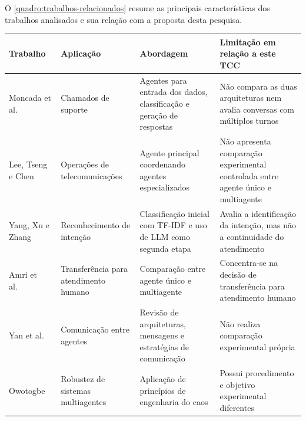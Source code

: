 O \autoref{quadro:trabalhos-relacionados} resume as principais características dos trabalhos analisados e sua relação com a proposta desta pesquisa.

\begin{quadro}[htb]
    \centering
    \caption{Síntese dos trabalhos relacionados}
    \label{quadro:trabalhos-relacionados}
    \footnotesize

    \begin{tabularx}{\textwidth}{|p{2.4cm}|p{2.8cm}|X|X|}
        \hline
        \textbf{Trabalho} &
        \textbf{Aplicação} &
        \textbf{Abordagem} &
        \textbf{Limitação em relação a este TCC} \\ \hline

        Moncada et al.~\cite{moncada2025} &
        Chamados de suporte &
        Agentes para entrada dos dados, classificação e geração de respostas &
        Não compara as duas arquiteturas nem avalia conversas com múltiplos turnos \\ \hline

        Lee, Tseng e Chen~\cite{lee2025} &
        Operações de telecomunicações &
        Agente principal coordenando agentes especializados &
        Não apresenta comparação experimental controlada entre agente único e multiagente \\ \hline

        Yang, Xu e Zhang~\cite{yang2025} &
        Reconhecimento de intenção &
        Classificação inicial com TF-IDF e uso de LLM como segunda etapa &
        Avalia a identificação da intenção, mas não a continuidade do atendimento \\ \hline

        Amri et al.~\cite{amri2026} &
        Transferência para atendimento humano &
        Comparação entre agente único e multiagente &
        Concentra-se na decisão de transferência para atendimento humano \\ \hline

        Yan et al.~\cite{yan2026} &
        Comunicação entre agentes &
        Revisão de arquiteturas, mensagens e estratégias de comunicação &
        Não realiza comparação experimental própria \\ \hline

        Owotogbe~\cite{owotogbe2025} &
        Robustez de sistemas multiagentes &
        Aplicação de princípios de engenharia do caos &
        Possui procedimento e objetivo experimental diferentes \\ \hline
    \end{tabularx}

    \fonteproprioautor
\end{quadro}

